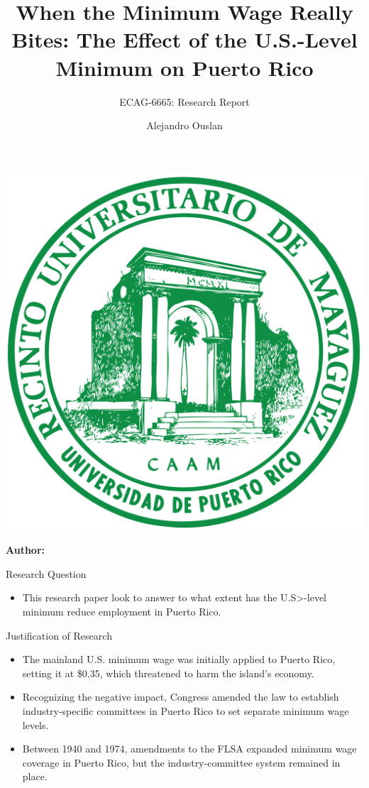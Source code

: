 \documentclass[12pt]{beamer}
\title[]{When the Minimum Wage Really Bites: The Effect of the U.S.-Level Minimum on Puerto Rico}
\subtitle{ECAG-6665: Research Report}
\author[Name Surname]{Alejandro Ouslan}
\institute[institute]{University of Puerto Rico}
\date{} %
\begin{document}
\begin{frame}{}
	\vspace{\fill}

	\includegraphics[width=0.16\linewidth]{../../assets/uprm_logo.png}

	\vspace{\fill}

	\Large
	\color{main}
	\inserttitle

	\medskip

	\large
	\color{black}
	\insertsubtitle

	\vspace{\fill}

	\footnotesize
	\insertinstitute

	\vspace{\fill}

	\textbf{Author:} \insertauthor

	\medskip

	\insertdate

	\vspace{\fill}
\end{frame}

\begin{frame}[allowframebreaks]{Research Question}
	\begin{itemize}
		\item This research paper look to answer to what extent has the U.S>-level minimum reduce employment in Puerto Rico.\cite{castillo1992minimum}
	\end{itemize}

\end{frame}

\begin{frame}[allowframebreaks]{Justification of Research}
	\begin{itemize}
		\item The mainland U.S. minimum wage was initially applied to Puerto Rico, setting it at \$0.35, which threatened to harm the island's economy.
		\item Recognizing the negative impact, Congress amended the law to establish industry-specific committees in Puerto Rico to set separate minimum wage levels.
		\item Between 1940 and 1974, amendments to the FLSA expanded minimum wage coverage in Puerto Rico, but the industry-committee system remained in place.
	\end{itemize}

\end{frame}
\end{document}
